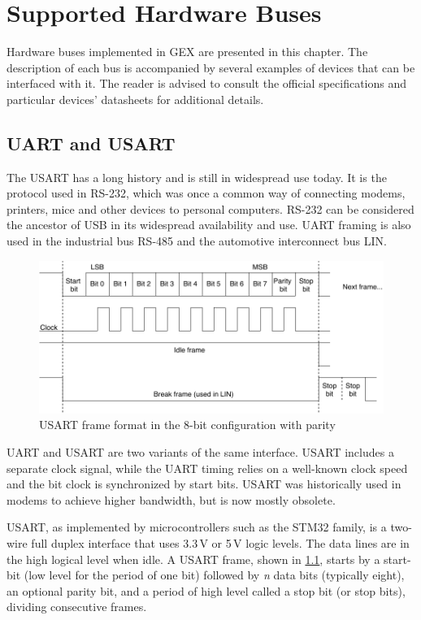 \chapter{Supported Hardware Buses} \label{ch:hw_buses}

Hardware buses implemented in GEX are presented in this chapter. The description of each bus is accompanied by several examples of devices that can be interfaced with it. The reader is advised to consult the official specifications and particular devices' datasheets for additional details.

\section{UART and USART} \label{sec:theory_usart}

The \acrfull{USART} has a long history and is still in widespread use today. It is the protocol used in RS-232, which was once a common way of connecting modems, printers, mice and other devices to personal computers. RS-232 can be considered the ancestor of \gls{USB} in its widespread availability and use. \gls{UART} framing is also used in the industrial bus RS-485 and the automotive interconnect bus \gls{LIN}.

\begin{figure}[h]
	\centering
	\includegraphics[scale=.9] {img/uart-frame-redraw.pdf}
	\caption[UART frame format]{\label{fig:uart_frame}\gls{USART} frame format in the 8-bit configuration with parity}
\end{figure}

\gls{UART} and \gls{USART} are two variants of the same interface. \gls{USART} includes a separate clock signal, while the \gls{UART} timing relies on a well-known clock speed and the bit clock is synchronized by start bits. \gls{USART} was historically used in modems to achieve higher bandwidth, but is now mostly obsolete.

\gls{USART}, as implemented by microcontrollers such as the STM32 family, is a two-wire full duplex interface that uses 3.3\,V or 5\,V logic levels. The data lines are in the high logical level when idle. A \gls{USART} frame, shown in \cref{fig:uart_frame}, starts by a start-bit (low level for the period of one bit) followed by \textit{n} data bits (typically eight), an optional parity bit, and a period of high level called a stop bit (or stop bits), dividing consecutive frames.

